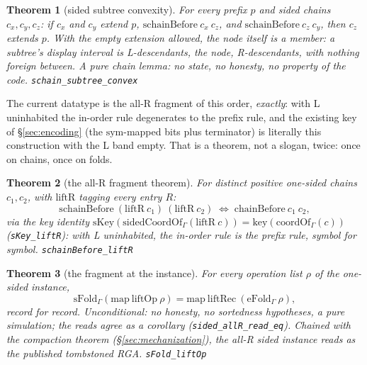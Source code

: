 \documentclass[11pt]{article}
\newtheorem{theorem}{Theorem}[section]
\newcommand{\lean}[1]{\texttt{#1}}
\begin{document}
\begin{theorem}[sided subtree convexity]
\label{thm:sconvex}
For every prefix $p$ and sided chains $c_x, c_y, c_z$: if $c_x$ and
$c_y$ extend $p$, $\mathrm{schainBefore}\ c_x\ c_z$, and
$\mathrm{schainBefore}\ c_z\ c_y$, then $c_z$ extends $p$. With the
empty extension allowed, the node itself is a member: a subtree's
display interval is L-descendants, the node, R-descendants, with
nothing foreign between. A pure chain lemma: no state, no honesty,
no property of the code.
\hfill\lean{schain\_subtree\_convex}
\end{theorem}

The current datatype is the all-R fragment of this order,
\emph{exactly}: with L uninhabited the in-order rule degenerates to the
prefix rule, and the existing key of \S\ref{sec:encoding} (the
$\mathrm{sym}$-mapped bits plus terminator) is literally this
construction with the L band empty. That is a theorem, not a slogan,
twice: once on chains, once on folds.

\begin{theorem}[the all-R fragment theorem]
\label{thm:fragment}
For distinct positive one-sided chains $c_1, c_2$, with
$\mathrm{liftR}$ tagging every entry $R$:
\[
  \mathrm{schainBefore}\ (\mathrm{liftR}\ c_1)\ (\mathrm{liftR}\ c_2)
  \;\iff\; \mathrm{chainBefore}\ c_1\ c_2,
\]
via the key identity
$\mathrm{sKey}(\mathrm{sidedCoordOf}_\Gamma(\mathrm{liftR}\ c)) =
\mathrm{key}(\mathrm{coordOf}_\Gamma(c))$ (\lean{sKey\_liftR}): with
L uninhabited, the in-order rule is the prefix rule, symbol for
symbol.
\hfill\lean{schainBefore\_liftR}
\end{theorem}

\begin{theorem}[the fragment at the instance]
\label{thm:sfoldlift}
For every operation list $\rho$ of the one-sided instance,
\[
  \mathrm{sFold}_\Gamma(\mathrm{map}\ \mathrm{liftOp}\ \rho)
  = \mathrm{map}\ \mathrm{liftRec}\ (\mathrm{eFold}_\Gamma\ \rho),
\]
record for record.
Unconditional: no honesty, no sortedness hypotheses, a pure
simulation; the reads agree as a corollary
(\lean{sided\_allR\_read\_eq}). Chained with the compaction theorem
(\S\ref{sec:mechanization}), the all-R sided instance reads as the
published tombstoned RGA.
\hfill\lean{sFold\_liftOp}
\end{theorem}
\end{document}
